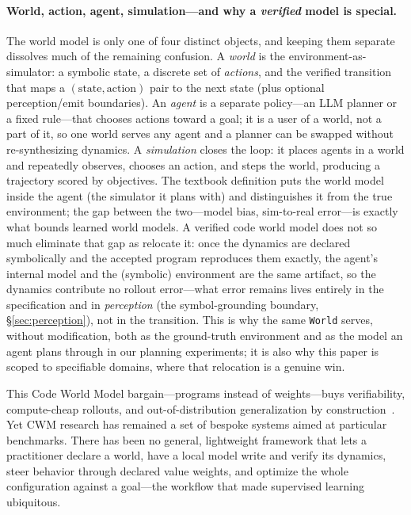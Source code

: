 \documentclass[11pt]{article}
\begin{document}
\paragraph{World, action, agent, simulation---and why a \emph{verified} model is
special.} The world model is only one of four distinct objects, and keeping them
separate dissolves much of the remaining confusion. A \emph{world} is the
environment-as-simulator: a symbolic state, a discrete set of \emph{actions}, and
the verified transition that maps a $(\textrm{state}, \textrm{action})$ pair to the
next state (plus optional perception/emit boundaries). An \emph{agent} is a
separate policy---an LLM planner or a fixed rule---that chooses actions
toward a goal; it is a user of a world, not a part of it, so one world serves
any agent and a planner can be swapped without re-synthesizing dynamics. A
\emph{simulation} closes the loop: it places agents in a world and repeatedly
observes, chooses an action, and steps the world, producing a trajectory scored by
objectives. The textbook definition puts the world model inside the agent
(the simulator it plans with) and distinguishes it from the true environment; the
gap between the two---model bias, sim-to-real error---is exactly what bounds learned
world models. A verified code world model does not so much eliminate that gap as
relocate it: once the dynamics are declared symbolically and the accepted
program reproduces them exactly, the agent's internal model and the (symbolic)
environment are the same artifact, so the dynamics contribute no rollout
error---what error remains lives entirely in the specification and in
\emph{perception} (the symbol-grounding boundary, \S\ref{sec:perception}),
not in the transition. This is why the same \texttt{World} serves, without
modification, both as the ground-truth environment and as the model an agent plans
through in our planning experiments; it is also why this paper is scoped to
specifiable domains, where that relocation is a genuine win.

This Code World Model bargain---programs instead of weights---buys verifiability,
compute-cheap rollouts,
and out-of-distribution generalization by construction~\cite{worldcoder2024,
gifmcts2024, poeworld2025, cwmgames2025}. Yet CWM research has remained a set
of bespoke systems aimed at particular benchmarks. There has been no general,
lightweight framework that lets a practitioner declare a world, have a
local model write and verify its dynamics, steer behavior through declared
value weights, and optimize the whole configuration against a goal---the
workflow that made supervised learning ubiquitous.
\end{document}

